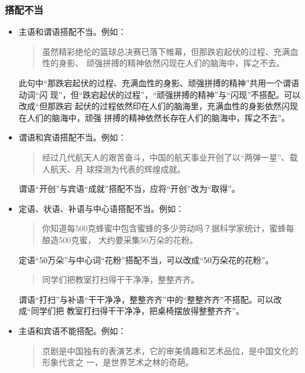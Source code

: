 \documentclass[final,oneside]{ctexbook}
\newenvironment{equotation}{\begin{quotation}\kaishu}{\end{quotation}}
\begin{document}
\subsubsection{搭配不当}

\begin{itemize}
  \item 主语和谓语搭配不当。例如：

    \begin{equotation}
      虽然精彩绝伦的篮球总决赛已落下帷幕，但那跌宕起伏的过程、充满血性的身影、
      顽强拼搏的精神依然闪现在人们的脑海中，挥之不去。
    \end{equotation}

    此句中“那跌宕起伏的过程、充满血性的身影、顽强拼搏的精神”共用一个谓语动词“闪
    现”，但“跌宕起伏的过程”，“顽强拼搏的精神”与“闪现”不搭配。可以改成“但那跌宕
    起伏的过程依然印在人们的脑海里，充满血性的身影依然闪现在人们的脑海中，顽强
    拼搏的精神依然长存在人们的脑海中，挥之不去”。

  \item 谓语和宾语搭配不当。例如：

    \begin{equotation}
      经过几代航天人的艰苦奋斗，中国的航天事业开创了以“两弹一星”、载人航天、月
      球探测为代表的辉煌成就。
    \end{equotation}

    谓语“开创”与宾语“成就”搭配不当，应将“开创”改为“取得”。

  \item 定语、状语、补语与中心语搭配不当。例如：

    \begin{equotation}
      你知道每500克蜂蜜中包含蜜蜂的多少劳动吗？据科学家统计，蜜蜂每酿造500克蜜，
      大约要采集50万朵的花粉。
    \end{equotation}

    定语“50万朵”与中心词“花粉”搭配不当，可以改成“50万朵花的花粉”。

    \begin{equotation}
      同学们把教室打扫得干干净净，整整齐齐。
    \end{equotation}

    谓语“打扫”与补语“干干净净，整整齐齐”中的“整整齐齐”不搭配。可以改成“同学们把
    教室打扫得干干净净，把桌椅摆放得整整齐齐”。

  \item 主语和宾语不能搭配。例如：

    \begin{equotation}
      京剧是中国独有的表演艺术，它的审美情趣和艺术品位，是中国文化的形象代言之
      一，是世界艺术之林的奇葩。
    \end{equotation}


\end{itemize}
\end{document}
